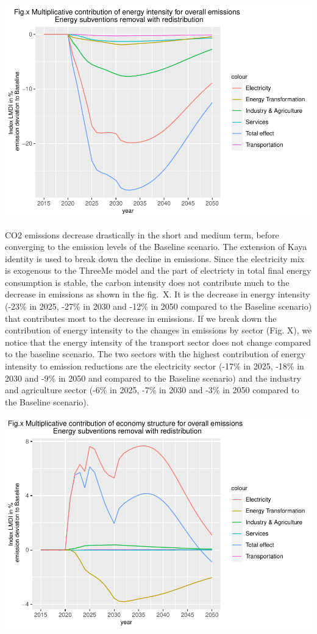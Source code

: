 \documentclass[
]{article}
\begin{document}
\begin{center}\includegraphics[width=0.7\linewidth,height=0.7\textheight]{Modele-ThreeMe-Tunisie_Sequeira_Valilou_Wang_files/figure-latex/unnamed-chunk-29-1} \end{center}

CO2 emissions decrease drastically in the short and medium term, before
converging to the emission levels of the Baseline scenario. The
extension of Kaya identity is used to break down the decline in
emissions. Since the electricity mix is exogenous to the ThreeMe model
and the part of electricty in total final energy consumption is stable,
the carbon intensity does not contribute much to the decrease in
emissions as shown in the fig.~X. It is the decrease in energy intensity
(-23\% in 2025, -27\% in 2030 and -12\% in 2050 compared to the Baseline
scenario) that contributes most to the decrease in emissions. If we
break down the contribution of energy intensity to the changes in
emissions by sector (Fig. X), we notice that the energy intensity of the
transport sector does not change compared to the baseline scenario. The
two sectors with the highest contribution of energy intensity to
emission reductions are the electricity sector (-17\% in 2025, -18\% in
2030 and -9\% in 2050 and compared to the Baseline scenario) and the
industry and agriculture sector (-6\% in 2025, -7\% in 2030 and -3\% in
2050 compared to the Baseline scenario).

\begin{center}\includegraphics{Modele-ThreeMe-Tunisie_Sequeira_Valilou_Wang_files/figure-latex/unnamed-chunk-30-1} \end{center}
\end{document}
